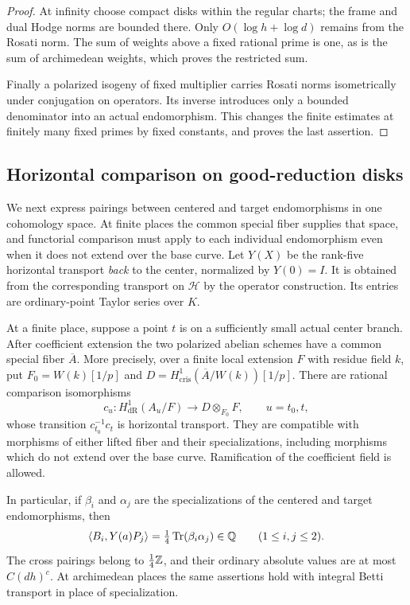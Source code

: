 \begin{proof}
At infinity choose compact
disks within the regular charts; the frame and dual Hodge norms
are bounded there.  Only $O(\log h+\log d)$ remains from the
Rosati norm.  The sum of weights above a fixed rational prime is
one, as is the sum of archimedean weights, which proves the
restricted sum.

Finally a polarized isogeny of fixed multiplier carries Rosati
norms isometrically under conjugation on operators.  Its inverse
introduces only a bounded denominator into an actual
endomorphism.  This changes the finite estimates at finitely many
fixed primes by fixed constants, and proves the last assertion.
\end{proof}

\subsection{Horizontal comparison on good-reduction disks}

We next express pairings between centered and target endomorphisms in
one cohomology space.  At finite places the common special fiber supplies
that space, and functorial comparison must apply to each individual
endomorphism even when it does not extend over the base curve.
Let $Y(X)$ be the rank-five horizontal transport \emph{back} to the
center, normalized by $Y(0)=I$.  It is obtained from the corresponding
transport on $\mathcal H$ by the operator construction.  Its entries
are ordinary-point Taylor series over $K$.

\begin{proposition}\label{prop:good-comparison}
At a finite place, suppose a point $t$ is on a sufficiently small
actual center branch.  After coefficient extension the two
polarized abelian schemes have a common special fiber $\overline A$.
More precisely, over a finite local extension $F$ with residue
field $k$, put $F_0=W(k)[1/p]$ and
$D=H^1_{\mathrm{cris}}(\overline A/W(k))[1/p]$.  There are rational
comparison isomorphisms
\[
 c_u:H^1_{\mathrm{dR}}(A_u/F)\longrightarrow D\otimes_{F_0}F,
 \qquad u=t_0,t,
\]
whose transition $c_{t_0}^{-1}c_t$ is horizontal transport.
They are compatible with morphisms of either lifted fiber and
their specializations, including morphisms which do not extend
over the base curve.  Ramification of the coefficient field is
allowed.

In particular, if $\beta_i$ and $\alpha_j$ are the specializations
of the centered and target endomorphisms, then
\begin{equation}\label{eq:cross-trace}
 \left\langle B_i,Y(a)P_j\right\rangle=\tfrac14\operatorname{Tr}(\beta_i\alpha_j)\in\mathbb Q
       \qquad(1\le i,j\le2).
\end{equation}
The cross pairings belong to $\tfrac14\mathbb Z$, and their ordinary
absolute values are at most $C(dh)^c$.  At archimedean places the
same assertions hold with integral Betti transport in place of
specialization.
\end{proposition}

